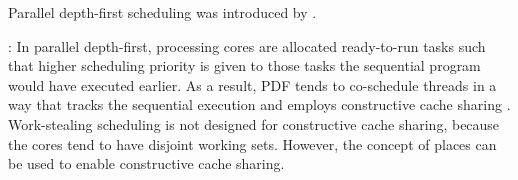 Parallel depth-first scheduling was introduced by
\textcite{Blelloch1999}. 

\textcite{Liaskovitis2006}: In parallel depth-first, processing cores
are allocated ready-to-run tasks such that higher scheduling priority
is given to those tasks the sequential program would have executed
earlier. As a result, PDF tends to co-schedule threads in a way that
tracks the sequential execution and employs constructive cache sharing
\cite{Liaskovitis2006, Chen2007}. Work-stealing scheduling is not
designed for constructive cache sharing, because the cores tend to
have disjoint working sets. However, the concept of places can be used
to enable constructive cache sharing.


